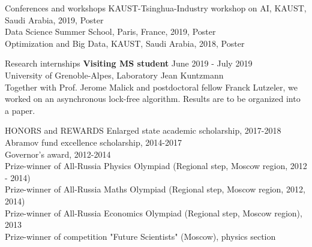 \documentclass{resume} %
\begin{document}
\begin{rSection}{Conferences and workshops}
{KAUST-Tsinghua-Industry workshop on AI, KAUST, Saudi Arabia, 2019, Poster}\\
{Data Science Summer School, Paris, France, 2019, Poster}\\
{Optimization and Big Data, KAUST, Saudi Arabia, 2018, Poster}\\
\end{rSection}

\begin{rSection}{Research internships}
{\bf Visiting MS student } \hfill June 2019 - July 2019 \\
University of Grenoble-Alpes, Laboratory Jean Kuntzmann\\
Together with Prof. Jerome Malick and postdoctoral fellow Franck Lutzeler, we worked on an asynchronous lock-free algorithm. Results are to be organized into a paper.
\end{rSection}





\begin{rSection}{HONORS and REWARDS}
{Enlarged state academic scholarship, 2017-2018}\\
{Abramov fund excellence scholarship, 2014-2017}\\
{Governor’s award, 2012-2014}\\
{Prize-winner of All-Russia Physics Olympiad (Regional step, Moscow region, 2012 - 2014)}\\
{Prize-winner of All-Russia Maths Olympiad (Regional step, Moscow region, 2012, 2014)}\\
{Prize-winner of All-Russia Economics Olympiad (Regional step, Moscow region), 2013}\\
{Prize-winner of competition "Future Scientists" (Moscow), physics section}

\end{rSection}

\end{document}
